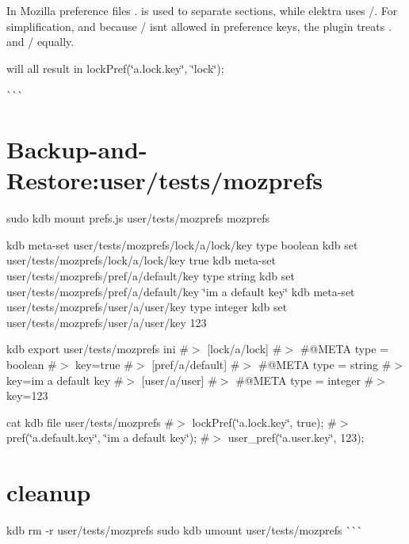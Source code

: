 In Mozilla preference files {\ttfamily .} is used to separate sections, while elektra uses {\ttfamily /}. For simplification, and because {\ttfamily /} isn\textquotesingle{}t allowed in preference keys, the plugin treats {\ttfamily .} and {\ttfamily /} equally.


\begin{DoxyCode}{0}
\end{DoxyCode}


will all result in {\ttfamily lock\+Pref(\char`\"{}a.\+lock.\+key\char`\"{}, \char`\"{}lock\char`\"{});}

\`{}\`{}\`{} \hypertarget{autotoc_md472_autotoc_md477}{}\section{Backup-\/and-\/\+Restore\+:user/tests/mozprefs}\label{autotoc_md472_autotoc_md477}
sudo kdb mount prefs.\+js user/tests/mozprefs mozprefs

kdb meta-\/set user/tests/mozprefs/lock/a/lock/key type boolean kdb set user/tests/mozprefs/lock/a/lock/key true kdb meta-\/set user/tests/mozprefs/pref/a/default/key type string kdb set user/tests/mozprefs/pref/a/default/key \char`\"{}i\textquotesingle{}m a default key\char`\"{} kdb meta-\/set user/tests/mozprefs/user/a/user/key type integer kdb set user/tests/mozprefs/user/a/user/key 123

kdb export user/tests/mozprefs ini \#$>$ \mbox{[}lock/a/lock\mbox{]} \#$>$ \#@\+M\+E\+TA type = boolean \#$>$ key=true \#$>$ \mbox{[}pref/a/default\mbox{]} \#$>$ \#@\+M\+E\+TA type = string \#$>$ key=i\textquotesingle{}m a default key \#$>$ \mbox{[}user/a/user\mbox{]} \#$>$ \#@\+M\+E\+TA type = integer \#$>$ key=123

cat {\ttfamily kdb file user/tests/mozprefs} \#$>$ lock\+Pref(\char`\"{}a.\+lock.\+key\char`\"{}, true); \#$>$ pref(\char`\"{}a.\+default.\+key\char`\"{}, \char`\"{}i\textquotesingle{}m a default key\char`\"{}); \#$>$ user\+\_\+pref(\char`\"{}a.\+user.\+key\char`\"{}, 123);\hypertarget{autotoc_md472_autotoc_md478}{}\section{cleanup}\label{autotoc_md472_autotoc_md478}
kdb rm -\/r user/tests/mozprefs sudo kdb umount user/tests/mozprefs \`{}\`{}\`{} 